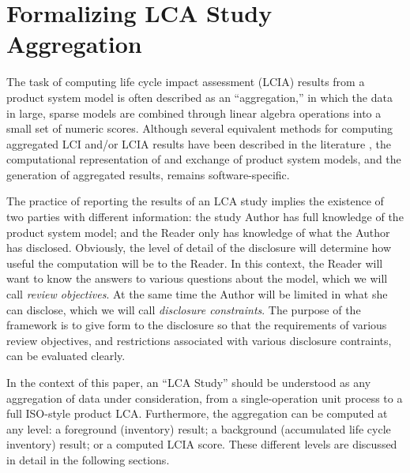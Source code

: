 \section{Formalizing LCA Study Aggregation}

The task of computing life cycle impact assessment (LCIA) results from a product system model is often described as an ``aggregation,'' in which the data in large, sparse models are combined through linear algebra operations into a small set of numeric scores.  Although several equivalent methods for computing aggregated LCI and/or LCIA results have been described in the literature \citep{Suh_2005, Peters_2007}, the computational representation of and exchange of product system models, and the generation of aggregated results, remains software-specific.  

The practice of reporting the results of an LCA study implies the existence of two parties with different information: the study Author has full knowledge of the product system model; and the Reader only has knowledge of what the Author has disclosed.  Obviously, the level of detail of the disclosure will determine how useful the computation will be to the Reader.  In this context, the Reader will want to know the answers to various questions about the model, which we will call \emph{review objectives}.  At the same time the Author will be limited in what she can disclose, which we will call \emph{disclosure constraints}.  The purpose of the framework is to give form to the disclosure so that the requirements of various review objectives, and restrictions associated with various disclosure contraints, can be evaluated clearly.

In the context of this paper, an ``LCA Study'' should be understood as any aggregation of data under consideration, from a single-operation unit process to a full ISO-style product LCA.  Furthermore, the aggregation can be computed at any level: a foreground (inventory) result; a background (accumulated life cycle inventory) result; or a computed LCIA score.  These different levels are discussed in detail in the following sections.  

